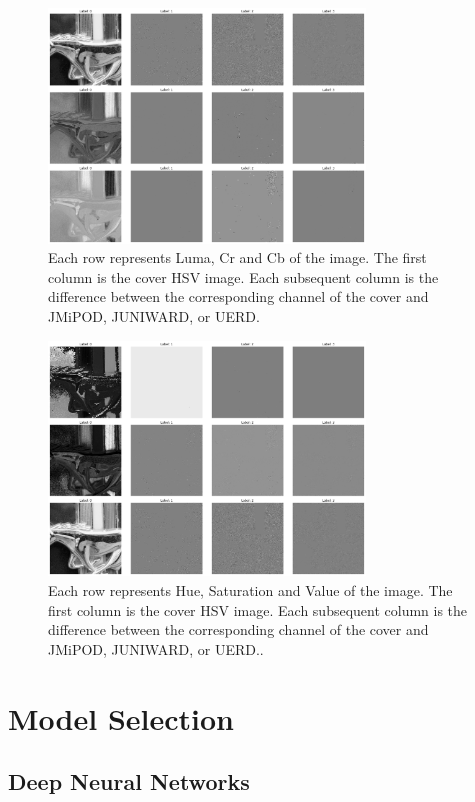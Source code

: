 \documentclass[letterpaper]{article}
\begin{document}
\begin{figure}
    \centering
    \includegraphics[width=0.75\textwidth]{channel_wise_diff.png}
    \caption{Each row represents Luma, Cr and Cb of the image. The first column is the cover HSV image. Each subsequent column is the difference between the corresponding channel of the cover and JMiPOD, JUNIWARD, or UERD.}
    \label{ycbcr-channel-wise}
\end{figure}
\begin{figure}
    \centering
    \includegraphics[width=0.75\textwidth]{channel_wise_diff_hsv.png}
    \caption{Each row represents Hue, Saturation and Value of the image. The first column is the cover HSV image. Each subsequent column is the difference between the corresponding channel of the cover and JMiPOD, JUNIWARD, or UERD..}
    \label{ycbcr-channel-wise-hsv}
\end{figure}

\section{Model Selection}

\subsection{Deep Neural Networks}
\end{document}
